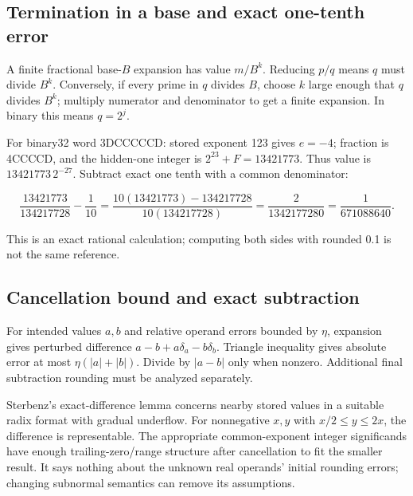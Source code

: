 \subsection{Termination in a base and exact one-tenth error}\label{03-visual-computing-i-ch018-termination-in-a-base-and-exact-one-tenth-error}

\hypertarget{03-visual-computing-i-ch018-termination-in-a-base-and-exact-one-tenth-error}{}

A finite fractional base-\(B\) expansion has value \(m/B^k\). Reducing \(p/q\) means \(q\) must divide \(B^k\). Conversely, if every prime in \(q\) divides \(B\), choose \(k\) large enough that \(q\) divides \(B^k\); multiply numerator and denominator to get a finite expansion. In binary this means \(q=2^j\).

For binary32 word 3DCCCCCD: stored exponent 123 gives \(e=-4\); fraction is 4CCCCD, and the hidden-one integer is \(2^{23}+F=13421773\). Thus value is \(13421773\,2^{-27}\). Subtract exact one tenth with a common denominator:

\[
\frac{13421773}{134217728}-\frac1{10}
=\frac{10(13421773)-134217728}{10(134217728)}
=\frac{2}{1342177280}=\frac1{671088640}.
\]

This is an exact rational calculation; computing both sides with rounded 0.1 is not the same reference.

\subsection{Cancellation bound and exact subtraction}\label{03-visual-computing-i-ch018-cancellation-bound-and-exact-subtraction}

\hypertarget{03-visual-computing-i-ch018-cancellation-bound-and-exact-subtraction}{}

For intended values \(a,b\) and relative operand errors bounded by \(\eta\), expansion gives perturbed difference \(a-b+a\delta_a-b\delta_b\). Triangle inequality gives absolute error at most \(\eta(|a|+|b|)\). Divide by \(|a-b|\) only when nonzero. Additional final subtraction rounding must be analyzed separately.

Sterbenz's exact-difference lemma concerns nearby stored values in a suitable radix format with gradual underflow. For nonnegative \(x,y\) with \(x/2\le y\le2x\), the difference is representable. The appropriate common-exponent integer significands have enough trailing-zero/range structure after cancellation to fit the smaller result. It says nothing about the unknown real operands' initial rounding errors; changing subnormal semantics can remove its assumptions.

